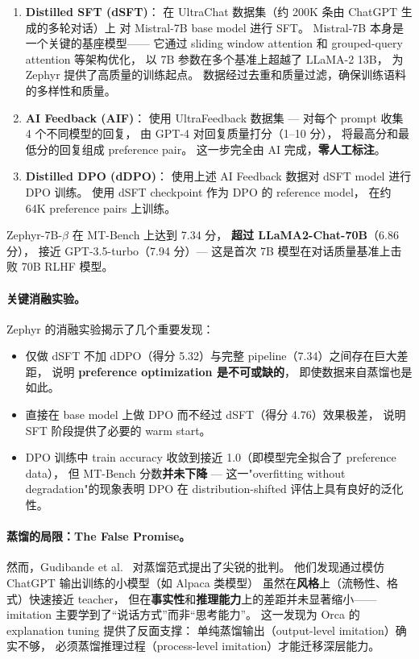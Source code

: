 \begin{enumerate}[leftmargin=2em]
  \item \textbf{Distilled SFT (dSFT)}：
    在 UltraChat 数据集（约 200K 条由 ChatGPT 生成的多轮对话）上
    对 Mistral-7B \cite{jiang2023mistral} base model 进行 SFT。
    Mistral-7B 本身是一个关键的基座模型——
    它通过 sliding window attention 和 grouped-query attention 等架构优化，
    以 7B 参数在多个基准上超越了 LLaMA-2 13B，
    为 Zephyr 提供了高质量的训练起点。
    数据经过去重和质量过滤，确保训练语料的多样性和质量。

  \item \textbf{AI Feedback (AIF)}：
    使用 UltraFeedback 数据集 ---
    对每个 prompt 收集 4 个不同模型的回复，
    由 GPT-4 对回复质量打分（1--10 分），
    将最高分和最低分的回复组成 preference pair。
    这一步完全由 AI 完成，\textbf{零人工标注}。

  \item \textbf{Distilled DPO (dDPO)}：
    使用上述 AI Feedback 数据对 dSFT model 进行 DPO 训练。
    使用 dSFT checkpoint 作为 DPO 的 reference model，
    在约 64K preference pairs 上训练。
\end{enumerate}

\noindent
Zephyr-7B-$\beta$ 在 MT-Bench 上达到 7.34 分，
\textbf{超过 LLaMA2-Chat-70B}（6.86 分），
接近 GPT-3.5-turbo（7.94 分）---
这是首次 7B 模型在对话质量基准上击败 70B RLHF 模型。

\paragraph{关键消融实验。}
Zephyr 的消融实验揭示了几个重要发现：
\begin{itemize}[leftmargin=2em]
  \item 仅做 dSFT 不加 dDPO（得分 5.32）与完整 pipeline（7.34）之间存在巨大差距，
    说明 \textbf{preference optimization 是不可或缺的}，
    即使数据来自蒸馏也是如此。
  \item 直接在 base model 上做 DPO 而不经过 dSFT（得分 4.76）效果极差，
    说明 SFT 阶段提供了必要的 warm start。
  \item DPO 训练中 train accuracy 收敛到接近 1.0（即模型完全拟合了 preference data），
    但 MT-Bench 分数\textbf{并未下降} ---
    这一"overfitting without degradation"的现象表明
    DPO 在 distribution-shifted 评估上具有良好的泛化性。
\end{itemize}

\paragraph{蒸馏的局限：The False Promise。}
然而，Gudibande et al.\ \cite{gudibande2023false} 对蒸馏范式提出了尖锐的批判。
他们发现通过模仿 ChatGPT 输出训练的小模型（如 Alpaca 类模型）
虽然在\textbf{风格}上（流畅性、格式）快速接近 teacher，
但在\textbf{事实性}和\textbf{推理能力}上的差距并未显著缩小——
imitation 主要学到了``说话方式''而非``思考能力''。
这一发现为 Orca 的 explanation tuning 提供了反面支撑：
单纯蒸馏输出（output-level imitation）确实不够，
必须蒸馏推理过程（process-level imitation）才能迁移深层能力。

